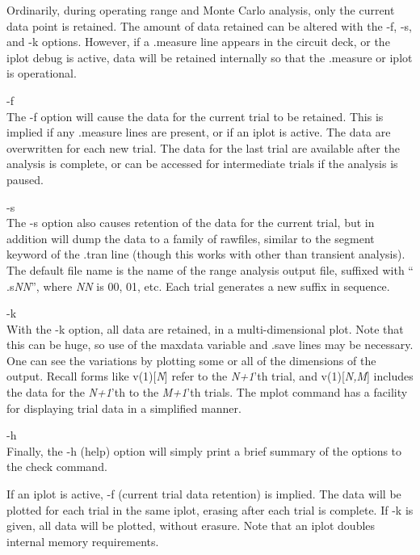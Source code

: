 Ordinarily, during operating range and Monte Carlo analysis, only the
current data point is retained.  The amount of data retained can be
altered with the {\vt -f}, {\vt -s}, and {\vt -k} options.  However,
if a {\vt .measure} line appears in the circuit deck, or the {\cb
iplot} debug is active, data will be retained internally so that the
{\vt .measure} or {\cb iplot} is operational.

\begin{description}
\item{\vt -f}\\
The {\vt -f} option will cause the data for the current trial to be
retained.  This is implied if any {\vt .measure} lines are present, or
if an {\cb iplot} is active.  The data are overwritten for each new
trial.  The data for the last trial are available after the analysis
is complete, or can be accessed for intermediate trials if the
analysis is paused.

\item{\vt -s}\\
The {\vt -s} option also causes retention of the data for the current
trial, but in addition will dump the data to a family of rawfiles,
similar to the {\vt segment} keyword of the {\vt .tran} line (though
this works with other than transient analysis).  The default file name
is the name of the range analysis output file, suffixed with ``{\vt
.s}{\it NN\/}'', where {\it NN} is 00, 01, etc.  Each trial generates
a new suffix in sequence.

\item{\vt -k}\\
With the {\vt -k} option, all data are retained, in a
multi-dimensional plot.  Note that this can be huge, so use of the
{\et maxdata} variable and {\vt .save} lines may be necessary.  One
can see the variations by plotting some or all of the dimensions of
the output.  Recall forms like {\vt v(1)[{\it N\/}]} refer to the {\it
N+1\/}'th trial, and {\vt v(1)[{\it N,M\/}]} includes the data for the
{\it N+1\/}'th to the {\it M+1\/}'th trials.  The {\et mplot} command
has a facility for displaying trial data in a simplified manner.

\item{\vt -h}\\
Finally, the {\vt -h} (help) option will simply print a brief summary
of the options to the {\cb check} command.
\end{description}

If an {\cb iplot} is active, {\vt -f} (current trial data retention)
is implied.  The data will be plotted for each trial in the same
{\cb iplot}, erasing after each trial is complete.  If {\vt -k} is
given, all data will be plotted, without erasure.  Note that an
iplot doubles internal memory requirements.

